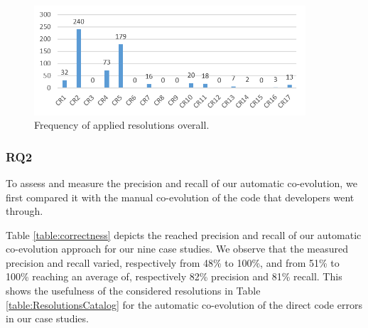 	
	
	\begin{figure}
		\centering
	\includegraphics[width=0.9\textwidth]{./pics/chapter1pics/FrequencyICSE.png}
	\caption{Frequency of applied resolutions overall.}
	\label{fig:frequency_resolutions}
	\end{figure}
	
	
	\subsubsection{RQ2}
	
	To assess and measure the precision and recall of our automatic co-evolution, we first compared it with the manual co-evolution of the code that developers went through. 
	
	Table \ref{table:correctness} depicts the reached precision and recall of our automatic co-evolution approach for our nine case studies. We observe that the measured precision and recall varied, respectively from 48\% to 100\%, and from 51\% to 100\% reaching an average of, respectively 82\% precision and 81\% recall. 
	This shows the usefulness of the considered resolutions in Table \ref{table:ResolutionsCatalog} for the automatic co-evolution of the direct code errors in our case studies. %
	
